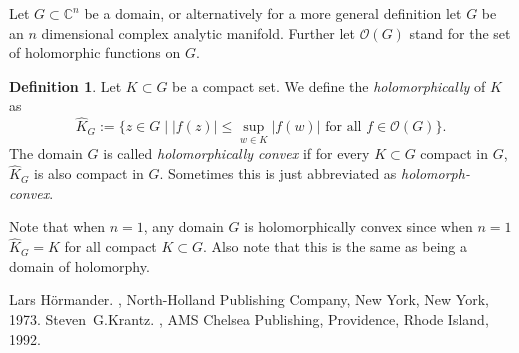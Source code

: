 \documentclass[12pt]{article}
\theoremstyle{theorem}
\theoremstyle{definition}
\newtheorem*{defn}{Definition}
\begin{document}
Let $G \subset {\mathbb{C}}^n$ be a domain, or alternatively for a more general definition let $G$ be an $n$ dimensional complex analytic manifold.
Further let ${\mathcal{O}}(G)$ stand for the set of holomorphic functions on $G$.

\begin{defn}
Let $K \subset G$ be a compact set.
We define the {\em holomorphically } of $K$ as
\begin{equation*}
\hat{K}_G := \{ z \in G \mid \lvert f(z) \rvert \leq \sup_{w \in K} \lvert f(w) \rvert \text{ for all } f \in {\mathcal{O}}(G) \} .
\end{equation*}
The domain $G$ is called {\em holomorphically convex} if for every $K \subset G$ compact in $G$, $\hat{K}_G$ is also compact in $G$.  Sometimes this is just abbreviated as {\em holomorph-convex}.
\end{defn}

Note that when $n=1$, any domain $G$ is holomorphically convex since when $n=1$ $\hat{K}_G = K$ for all compact $K \subset G$.  Also note that this is the same as being a domain of holomorphy.

\begin{thebibliography}{9}
Lars H\"ormander.
{\em {}},
North-Holland Publishing Company, New York, New York, 1973.
Steven~G.\@ Krantz.
{\em {}},
AMS Chelsea Publishing, Providence, Rhode Island, 1992.
\end{thebibliography}
\end{document}
